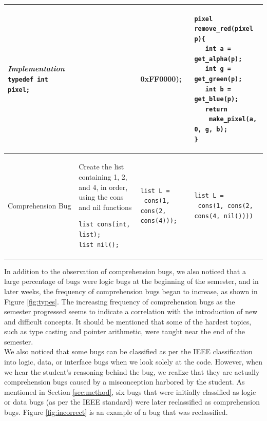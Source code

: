 \documentclass{sig-alternate}
\begin{document}
\begin{table}
\begin{tabular}{|p{0.95in}|p{1.7in}|p{1.9in}|p{2.1in}|}
\emph{Implementation}
\verb|typedef int pixel;|
\vspace{0.1in}
&
\begin{verbatim}
pixel remove_red(pixel p){
   return (p & 0xFF0000);
}
\end{verbatim}
&
\begin{verbatim}
pixel remove_red(pixel p){
   int a = get_alpha(p);
   int g = get_green(p);
   int b = get_blue(p);
   return
    make_pixel(a, 0, g, b);
}
\end{verbatim}\\
\hline
\vspace{0.05in}
Comprehension Bug &
\vspace{0.05in}
Create the list containing 1, 2, and 4, in order, using the cons and nil functions
\begin{verbatim}
list cons(int, list);
list nil();
\end{verbatim}
\vspace{0.1in}
&
\begin{verbatim}
list L =
 cons(1, cons(2, cons(4)));
\end{verbatim}
&
\begin{verbatim}
list L =
 cons(1, cons(2, cons(4, nil())))
\end{verbatim}
\\ \hline
\end{tabular}
\end{table}

In addition to the observation of comprehension bugs, we also noticed that a large percentage of bugs were logic bugs at the beginning of the semester, and in later weeks, the frequency of comprehension bugs began to increase, as shown in Figure \ref{fig:types}. The increasing frequency of comprehension bugs as the semester progressed seems to indicate a correlation with the introduction of new and difficult concepts. It should be mentioned that some of the hardest topics, such as type casting and pointer arithmetic, were taught near the end of the semester.\\

We also noticed that some bugs can be classified as per the IEEE classification into logic, data, or interface bugs when we look solely at the code. However, when we hear the student's reasoning behind the bug, we realize that they are actually comprehension bugs caused by a misconception harbored by the student. As mentioned in Section \ref{sec:method}, six bugs that were initially classified as logic or data bugs (as per the IEEE standard) were later reclassified as comprehension bugs. Figure \ref{fig:incorrect} is an example of a bug that was reclassified.\\
\end{document}
